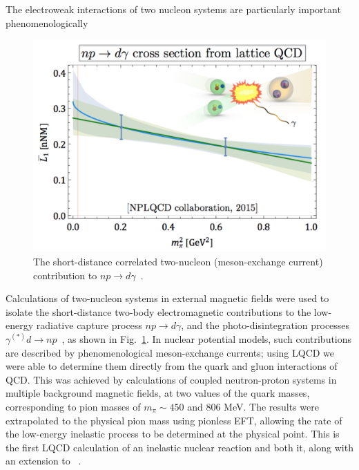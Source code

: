 The electroweak interactions of two nucleon systems are particularly important phenomenologically 
\begin{figure}
	\centering
	\includegraphics[width=0.48\columnwidth]{figures/npTOdgamma.png}  
	\caption{ 
		The short-distance correlated two-nucleon (meson-exchange current)
		contribution to $np\rightarrow d\gamma$~\protect\cite{Beane:2015yha}.    
	}
	\label{fig:L1bar}
	\vspace*{-0.4cm}
\end{figure}
%
Calculations of two-nucleon systems in external magnetic fields were used to isolate the
short-distance two-body electromagnetic contributions to the low-energy radiative capture process $np\rightarrow d\gamma$,
and the photo-disintegration processes $\gamma^{(*)}d\rightarrow np$~\cite{Beane:2015yha},
as shown in Fig.~\ref{fig:L1bar}. 
In nuclear potential models, such contributions are described by 
phenomenological meson-exchange currents; using LQCD we were able to determine them directly from the quark and gluon interactions of QCD.
This was achieved by calculations of coupled neutron-proton systems in multiple background magnetic fields, at two values of the 
quark masses, corresponding to pion masses of $m_\pi\sim 450$ and 806 MeV. The results were extrapolated to the physical pion mass using pionless EFT, allowing the rate of the low-energy inelastic process to be determined 
at the physical point. 
%
%
This is the first LQCD calculation of an inelastic nuclear reaction and both it, along with an extension to ~\cite{Beane:2015yha,Detmold:2015daa}. 




